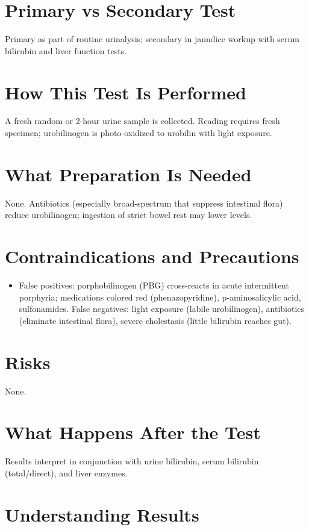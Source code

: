 \section*{Primary vs Secondary Test}
Primary as part of routine urinalysis; secondary in jaundice workup with serum bilirubin and liver function tests.

\section*{How This Test Is Performed}
A fresh random or 2-hour urine sample is collected. Reading requires fresh specimen; urobilinogen is photo-oxidized to urobilin with light exposure.

\section*{What Preparation Is Needed}
None. Antibiotics (especially broad-spectrum that suppress intestinal flora) reduce urobilinogen; ingestion of strict bowel rest may lower levels.

\section*{Contraindications and Precautions}
\begin{itemize}
  \item False positives: porphobilinogen (PBG) cross-reacts in acute intermittent porphyria; medications colored red (phenazopyridine), p-aminosalicylic acid, sulfonamides. False negatives: light exposure (labile urobilinogen), antibiotics (eliminate intestinal flora), severe cholestasis (little bilirubin reaches gut).
\end{itemize}
\section*{Risks}
None.

\section*{What Happens After the Test}
Results interpret in conjunction with urine bilirubin, serum bilirubin (total/direct), and liver enzymes.

\section*{Understanding Results}

